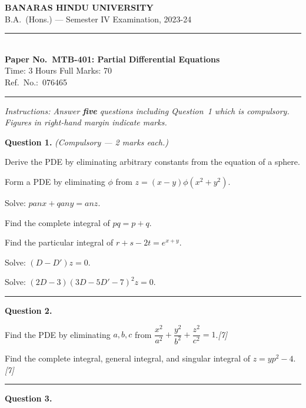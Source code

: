 \documentclass[11pt,a4paper]{article}
\newcommand{\pts}[1]{\hfill   \textit{[#1]}}
\begin{document}
\begin{center}
  {\large\bfseries BANARAS HINDU UNIVERSITY}\\[2pt]
  {\normalsize B.A.\ (Hons.) --- Semester IV Examination, 2023-24}\\[6pt]
  \rule{0.8\linewidth}{0.5pt}\\[6pt]
  {\large\bfseries Paper No.\ MTB-401: Partial Differential Equations}\\[4pt]
  {\normalsize Time: 3 Hours \hfill Full Marks: 70}\\[2pt]
  {\small Ref.\ No.:\ 076465}
\end{center}
\rule{\linewidth}{0.4pt}
\smallskip



\noindent   \textit{Instructions: Answer   \textbf{five} questions including Question~1 which is compulsory. Figures in right-hand margin indicate marks.}
\bigskip




\noindent   \textbf{Question 1.}   \textit{(Compulsory --- 2 marks each.)}

\begin{parts}
  \item Derive the PDE by eliminating arbitrary constants from the equation of a sphere.
  \item Form a PDE by eliminating $\phi$ from $z=(x-y)\phi(x^2+y^2)$.
  \item Solve: $p an x+q an y= an z$.
  \item Find the complete integral of $pq=p+q$.
  \item Find the particular integral of $r+s-2t=e^{x+y}$.
  \item Solve: $(D-D')z=0$.
  \item Solve: $(2D-3)(3D-5D'-7)^2 z=0$.
\end{parts}
\medskip\rule{\linewidth}{0.2pt}

\medskip


\noindent   \textbf{Question 2.}

\begin{parts}
  \item Find the PDE by eliminating $a,b,c$ from $\dfrac{x^2}{a^2}+\dfrac{y^2}{b^2}+\dfrac{z^2}{c^2}=1$.\pts{7}
  \item Find the complete integral, general integral, and singular integral of $z=yp^2-4$.\pts{7}
\end{parts}
\medskip\rule{\linewidth}{0.2pt}

\medskip


\noindent   \textbf{Question 3.}
\end{document}
